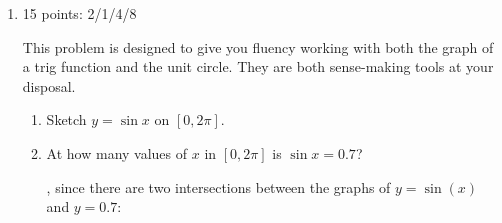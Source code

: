 \documentclass{article}
\begin{document}
\begin{enumerate}[topsep=0pt]
\begin{enumerate}
\begin{enumerate}
        \begin{solution}
          Since $\tan\! \left( \frac{3 \pi}{4} \right) = - 1$, this
          is asking for $\arctan(-1)$, which is $\boxed{- \frac{\pi}{4}}$. 
        \end{solution}
      \end{enumerate}
    \probonly{\end{multicols}}
  \end{enumerate}
  \pspace{\vfill}
  \pspace{\newpage}


\item 

\begin{grading}
 15 points:   2/1/4/8
\end{grading}


This problem is designed to give you fluency working with both
the graph of a trig function and the unit circle. They are both
sense-making tools at your disposal.

\begin{enumerate}[topsep=0pt]
  \item
\begin{problem}[\stretch{2}]
      Sketch $y = \sin x$ on $[0, 2 \pi]$. 
    \end{problem}

    \begin{solution}
      \begin{center}
      \end{center}
    \end{solution}

  \item
    \begin{problem}[\stretch{1}]
      At how many values of $x$ in $[0, 2\pi]$ is $\sin x = 0.7$?
    \end{problem}

    \begin{solution}
      , since there are two intersections between the graphs of
      $y=\sin(x)$ and $y=0.7$: 
      \begin{center}
      \end{center}
    \end{solution}


\end{enumerate}
\end{enumerate}
\end{document}
